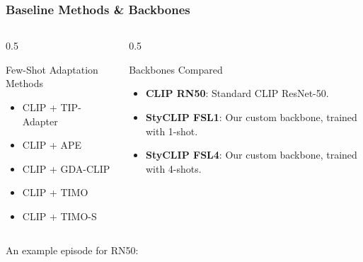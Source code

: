 \documentclass{beamer}
\begin{document}
\begin{frame}
  \frametitle{Baseline Methods \& Backbones}
  \begin{columns}[T]
  \begin{column}{0.5\textwidth}
    \begin{block}{Few-Shot Adaptation Methods}
      \begin{itemize}
        \item CLIP + TIP-Adapter \cite{TipAdapter}
        \item CLIP + APE \cite{APE}
        \item CLIP + GDA-CLIP \cite{GDA_CLIP}
        \item CLIP + TIMO \cite{TIMO}
        \item CLIP + TIMO-S
      \end{itemize}
    \end{block}
  \end{column}
  \begin{column}{0.5\textwidth}
    \begin{block}{Backbones Compared}
      \begin{itemize}
        \item \textbf{CLIP RN50}: Standard CLIP ResNet-50.
        \item \textbf{StyCLIP FSL1}: Our custom backbone, trained with 1-shot.
        \item \textbf{StyCLIP FSL4}: Our custom backbone, trained with 4-shots.
      \end{itemize}
    \end{block}
  \end{column}
  \end{columns}
  An example episode for RN50:
\end{frame}



\end{document}
